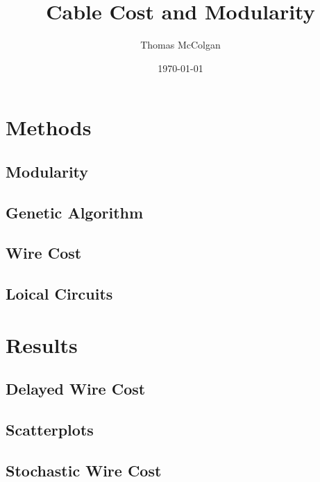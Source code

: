 \documentclass[12pt]{article}
\begin{document}
\title{Cable Cost and Modularity}
\author{Thomas McColgan}
\date{\today}
\maketitle

\section{Methods}

\subsection{Modularity}
\subsection{Genetic Algorithm}
\subsection{Wire Cost}
\subsection{Loical Circuits}




\section{Results}
\subsection{Delayed Wire Cost}
\subsection{Scatterplots}
\subsection{Stochastic Wire Cost}
\end{document}

